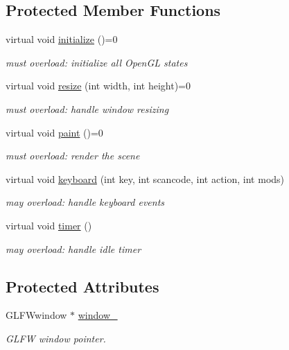 \subsection*{Protected Member Functions}
\begin{DoxyCompactItemize}
\item 
virtual void \hyperlink{classGLFW__window_a14a56877d0edc611e1e69c1f924183bb}{initialize} ()=0
\begin{DoxyCompactList}\small\item\em must overload\+: initialize all Open\+GL states \end{DoxyCompactList}\item 
virtual void \hyperlink{classGLFW__window_a64044226d3bd2c9b286d837b7fa8ae7c}{resize} (int width, int height)=0
\begin{DoxyCompactList}\small\item\em must overload\+: handle window resizing \end{DoxyCompactList}\item 
virtual void \hyperlink{classGLFW__window_ac1dffdbaead812e20c696348f4aff460}{paint} ()=0
\begin{DoxyCompactList}\small\item\em must overload\+: render the scene \end{DoxyCompactList}\item 
virtual void \hyperlink{classGLFW__window_a23f66e5464a50bd3196b5308afce5f92}{keyboard} (int key, int scancode, int action, int mods)
\begin{DoxyCompactList}\small\item\em may overload\+: handle keyboard events \end{DoxyCompactList}\item 
virtual void \hyperlink{classGLFW__window_af12f8511c1311546f8cecabb556cae74}{timer} ()
\begin{DoxyCompactList}\small\item\em may overload\+: handle idle timer \end{DoxyCompactList}\end{DoxyCompactItemize}
\subsection*{Protected Attributes}
\begin{DoxyCompactItemize}
\item 
G\+L\+F\+Wwindow $\ast$ \hyperlink{classGLFW__window_aa4396bd9557a5476690132bf6a0efcdf}{window\+\_\+}
\begin{DoxyCompactList}\small\item\em G\+L\+FW window pointer. \end{DoxyCompactList}\end{DoxyCompactItemize}
